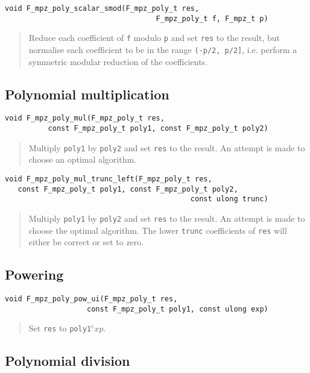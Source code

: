 \documentclass[a4paper,10pt]{article}
\newcommand{\code}{\lstinline}
\begin{document}
\begin{lstlisting}
void F_mpz_poly_scalar_smod(F_mpz_poly_t res, 
                                   F_mpz_poly_t f, F_mpz_t p)
\end{lstlisting}
\begin{quote}
Reduce each coefficient of \code{f} modulo \code{p} and set \code{res} to the result, but normalise 
each coefficient to be in the range \code{(-p/2, p/2]}, i.e. perform a symmetric modular reduction 
of the coefficients.
\end{quote}

\subsection{Polynomial multiplication}

\begin{lstlisting}
void F_mpz_poly_mul(F_mpz_poly_t res, 
          const F_mpz_poly_t poly1, const F_mpz_poly_t poly2)
\end{lstlisting}
\begin{quote}
Multiply \code{poly1} by \code{poly2} and set \code{res} to the result. An attempt is made to choose 
an optimal algorithm.
\end{quote}

\begin{lstlisting}
void F_mpz_poly_mul_trunc_left(F_mpz_poly_t res, 
   const F_mpz_poly_t poly1, const F_mpz_poly_t poly2, 
                                           const ulong trunc)
\end{lstlisting}
\begin{quote}
Multiply \code{poly1} by \code{poly2} and set \code{res} to the result. An attempt is made to choose 
the optimal algorithm. The lower \code{trunc} coefficients of \code{res} will either be correct or
set to zero.
\end{quote}

\subsection{Powering}

\begin{lstlisting}
void F_mpz_poly_pow_ui(F_mpz_poly_t res, 
                   const F_mpz_poly_t poly1, const ulong exp)
\end{lstlisting}
\begin{quote}
Set \code{res} to \code{poly1}$^exp$.
\end{quote}

\subsection{Polynomial division}
\end{document}

